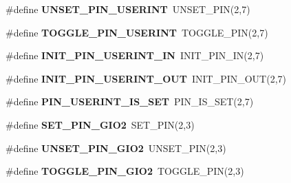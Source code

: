 \begin{DoxyCompactItemize}
\item 
\hypertarget{group__chaos__internal_gaf50dd28e301252221584ba3d18b01410}{\#define {\bfseries U\-N\-S\-E\-T\-\_\-\-P\-I\-N\-\_\-\-U\-S\-E\-R\-I\-N\-T}~U\-N\-S\-E\-T\-\_\-\-P\-I\-N(2,7)}\label{group__chaos__internal_gaf50dd28e301252221584ba3d18b01410}

\item 
\hypertarget{group__chaos__internal_ga916a9186bb4f182e5af266d4dc90cff7}{\#define {\bfseries T\-O\-G\-G\-L\-E\-\_\-\-P\-I\-N\-\_\-\-U\-S\-E\-R\-I\-N\-T}~T\-O\-G\-G\-L\-E\-\_\-\-P\-I\-N(2,7)}\label{group__chaos__internal_ga916a9186bb4f182e5af266d4dc90cff7}

\item 
\hypertarget{group__chaos__internal_gaa39505be5534abf8580acdbfdf1235bd}{\#define {\bfseries I\-N\-I\-T\-\_\-\-P\-I\-N\-\_\-\-U\-S\-E\-R\-I\-N\-T\-\_\-\-I\-N}~I\-N\-I\-T\-\_\-\-P\-I\-N\-\_\-\-I\-N(2,7)}\label{group__chaos__internal_gaa39505be5534abf8580acdbfdf1235bd}

\item 
\hypertarget{group__chaos__internal_gad77f955775b5eea291071fecad3d0c1b}{\#define {\bfseries I\-N\-I\-T\-\_\-\-P\-I\-N\-\_\-\-U\-S\-E\-R\-I\-N\-T\-\_\-\-O\-U\-T}~I\-N\-I\-T\-\_\-\-P\-I\-N\-\_\-\-O\-U\-T(2,7)}\label{group__chaos__internal_gad77f955775b5eea291071fecad3d0c1b}

\item 
\hypertarget{group__chaos__internal_ga30d361bf620ac4442ff19d4743a5d9f2}{\#define {\bfseries P\-I\-N\-\_\-\-U\-S\-E\-R\-I\-N\-T\-\_\-\-I\-S\-\_\-\-S\-E\-T}~P\-I\-N\-\_\-\-I\-S\-\_\-\-S\-E\-T(2,7)}\label{group__chaos__internal_ga30d361bf620ac4442ff19d4743a5d9f2}

\item 
\hypertarget{group__chaos__internal_ga1909ecbab5c4c09bb52418812c297925}{\#define {\bfseries S\-E\-T\-\_\-\-P\-I\-N\-\_\-\-G\-I\-O2}~S\-E\-T\-\_\-\-P\-I\-N(2,3)}\label{group__chaos__internal_ga1909ecbab5c4c09bb52418812c297925}

\item 
\hypertarget{group__chaos__internal_gaaddd7bcc324b82054cfc6fab52ea04a8}{\#define {\bfseries U\-N\-S\-E\-T\-\_\-\-P\-I\-N\-\_\-\-G\-I\-O2}~U\-N\-S\-E\-T\-\_\-\-P\-I\-N(2,3)}\label{group__chaos__internal_gaaddd7bcc324b82054cfc6fab52ea04a8}

\item 
\hypertarget{group__chaos__internal_gac2026e3db014a7bb8d1b73dfbc4667d6}{\#define {\bfseries T\-O\-G\-G\-L\-E\-\_\-\-P\-I\-N\-\_\-\-G\-I\-O2}~T\-O\-G\-G\-L\-E\-\_\-\-P\-I\-N(2,3)}\label{group__chaos__internal_gac2026e3db014a7bb8d1b73dfbc4667d6}


\end{DoxyCompactItemize}
